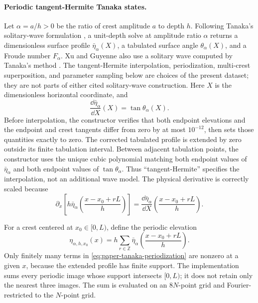 \paragraph{Periodic tangent-Hermite Tanaka states.}
Let $\alpha=a/h>0$ be the ratio of crest amplitude $a$ to depth $h$.
Following Tanaka's solitary-wave formulation \cite{tanaka1986}, a unit-depth
solve at amplitude ratio $\alpha$ returns a dimensionless surface profile
$\bar\eta_\alpha(X)$, a tabulated surface angle $\theta_\alpha(X)$, and a
Froude number $F_\alpha$.  Xu and Guyenne also use a solitary wave computed
by Tanaka's method \cite{xu2009}.  The tangent-Hermite interpolation,
periodization, multi-crest superposition, and parameter sampling below are
choices of the present dataset; they are not parts of either cited
solitary-wave construction.  Here $X$ is the dimensionless horizontal
coordinate, and
\begin{equation}
  \frac{\dd\bar\eta_\alpha}{\dd X}(X)
  =\tan\theta_\alpha(X).
  \label{eq:paper-tanaka-slope}
\end{equation}
Before interpolation, the constructor verifies that both endpoint elevations
and the endpoint and crest tangents differ from zero by at most $10^{-12}$,
then sets those quantities exactly to zero.  The corrected tabulated profile
is extended by zero outside its finite tabulation interval.  Between adjacent
tabulation points, the constructor uses the unique cubic polynomial matching
both endpoint values of $\bar\eta_\alpha$ and both endpoint values of
$\tan\theta_\alpha$.  Thus ``tangent-Hermite'' specifies the interpolation,
not an additional wave model.  The physical derivative is correctly scaled
because
\begin{equation}
  \partial_x\!\left[
    h\bar\eta_\alpha\!\left(\frac{x-x_0+rL}{h}\right)
  \right]
  =
  \frac{\dd\bar\eta_\alpha}{\dd X}
  \!\left(\frac{x-x_0+rL}{h}\right).
  \label{eq:paper-tanaka-scaled-slope}
\end{equation}

For a crest centered at $x_0\in[0,L)$, define the periodic elevation
\begin{equation}
  \eta_{\alpha,h,x_0}(x)
  =
  h\sum_{r\in\mathbb Z}
  \bar\eta_\alpha\!\left(\frac{x-x_0+rL}{h}\right).
  \label{eq:paper-tanaka-periodization}
\end{equation}
Only finitely many terms in \cref{eq:paper-tanaka-periodization} are nonzero
at a given $x$, because the extended profile has finite support.  The
implementation sums every periodic image whose support intersects $[0,L)$;
it does not retain only the nearest three images.  The sum is evaluated on an
$8N$-point grid and Fourier-restricted to the $N$-point grid.

